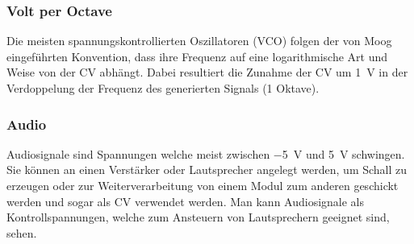 \subsubsection{Volt per Octave}
\label{sec:org77b4fe3}
Die meisten spannungskontrollierten Oszillatoren (VCO) folgen der von Moog eingeführten Konvention, dass ihre Frequenz auf eine logarithmische Art und Weise von der \acl{CV} abhängt. Dabei resultiert die Zunahme der \acl{CV} um \SI{1}{\volt} in der Verdoppelung der Frequenz des generierten Signals (1 Oktave).

\subsubsection{Audio}
\label{sec:org84450bd}
Audiosignale sind Spannungen welche meist zwischen \SI{-5}{\volt} und \SI{5}{\volt} schwingen. Sie können an einen Verstärker oder Lautsprecher angelegt werden, um Schall zu erzeugen oder zur Weiterverarbeitung von einem Modul zum anderen geschickt werden und sogar als \acl{CV} verwendet werden. Man kann Audiosignale als Kontrollspannungen, welche zum Ansteuern von Lautsprechern geeignet sind, sehen.
